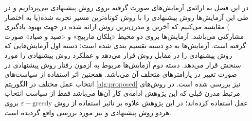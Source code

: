 در این فصل به ارائه‌ی آزمایش‌های صورت گرفته بروی روش پیشنهادی می‌پردازیم و در طی این آزمایش‌ها روش‌ پیشنهادی را با روش کوتاه‌ترین مسیر تجربه شده(یا به اختصار ) مقایسه می‌کنیم که آخرین و مدرن‌ترین روش‌ ارائه شده در جهت بهبود یادگیری مشارکتی می‌باشد. آزما‌یش‌ها بروی دو محیط «پلکان مارپیچ» و «صید و صیاد» صورت گرفته است. آزمایش‌ها به دو دسته تقسیم بندی شده است؛ دسته اول آزمایش‌هایی که روش پیشنهادی را در مقابل روش  قرار می‌دهد و عملکرد روش پیشنهادی را مورد سنجش قرار می‌دهد. دسته دوم آزمایش‌ها مربوط به آزمون رفتار روش پیشنهادی در صورت تغییر در پارامتر‌های متخلف آن می‌باشد. همچنین اثر استفاده از سیاست‌های انتخاب عمل مختلف در الگوریتم \ref{alg:proposed} نیز بررسی شده است. در روش‌های مرتبط مدرن قبلی  که این پژوهش ادامه‌ی کار آن‌ها می‌باشد فقط از سیاست انتخاب عمل  استفاده کرده‌اند؛ در این پژوهش علاوه بر  تاثیر استفاده از روش $\varepsilon-\text{greedy}$ بروی هردو روش پیشنهادی و  نیز مورد بررسی واقع گردیده است.